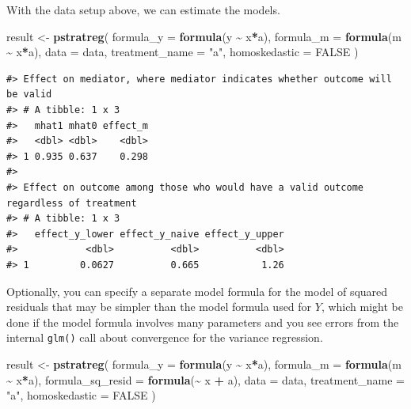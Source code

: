 \documentclass[
]{book}
\newenvironment{Shaded}{\begin{snugshade}}{\end{snugshade}}
\newcommand{\AttributeTok}[1]{\textcolor[rgb]{0.13,0.29,0.53}{#1}}
\newcommand{\ConstantTok}[1]{\textcolor[rgb]{0.56,0.35,0.01}{#1}}
\newcommand{\FunctionTok}[1]{\textcolor[rgb]{0.13,0.29,0.53}{\textbf{#1}}}
\newcommand{\NormalTok}[1]{#1}
\newcommand{\OtherTok}[1]{\textcolor[rgb]{0.56,0.35,0.01}{#1}}
\newcommand{\SpecialCharTok}[1]{\textcolor[rgb]{0.81,0.36,0.00}{\textbf{#1}}}
\newcommand{\StringTok}[1]{\textcolor[rgb]{0.31,0.60,0.02}{#1}}
\begin{document}
With the data setup above, we can estimate the models.

\begin{Shaded}
\begin{Highlighting}[]
\NormalTok{result }\OtherTok{\textless{}{-}} \FunctionTok{pstratreg}\NormalTok{(}
  \AttributeTok{formula\_y =} \FunctionTok{formula}\NormalTok{(y }\SpecialCharTok{\textasciitilde{}}\NormalTok{ x}\SpecialCharTok{*}\NormalTok{a),}
  \AttributeTok{formula\_m =} \FunctionTok{formula}\NormalTok{(m }\SpecialCharTok{\textasciitilde{}}\NormalTok{ x}\SpecialCharTok{*}\NormalTok{a),}
  \AttributeTok{data =}\NormalTok{ data,}
  \AttributeTok{treatment\_name =} \StringTok{"a"}\NormalTok{,}
  \AttributeTok{homoskedastic =} \ConstantTok{FALSE}
\NormalTok{)}
\end{Highlighting}
\end{Shaded}

\begin{verbatim}
#> Effect on mediator, where mediator indicates whether outcome will be valid
#> # A tibble: 1 x 3
#>   mhat1 mhat0 effect_m
#>   <dbl> <dbl>    <dbl>
#> 1 0.935 0.637    0.298
#> 
#> Effect on outcome among those who would have a valid outcome regardless of treatment
#> # A tibble: 1 x 3
#>   effect_y_lower effect_y_naive effect_y_upper
#>            <dbl>          <dbl>          <dbl>
#> 1         0.0627          0.665           1.26
\end{verbatim}

Optionally, you can specify a separate model formula for the model of squared residuals that may be simpler than the model formula used for \(Y\), which might be done if the model formula involves many parameters and you see errors from the internal \texttt{glm()} call about convergence for the variance regression.

\begin{Shaded}
\begin{Highlighting}[]
\NormalTok{result }\OtherTok{\textless{}{-}} \FunctionTok{pstratreg}\NormalTok{(}
  \AttributeTok{formula\_y =} \FunctionTok{formula}\NormalTok{(y }\SpecialCharTok{\textasciitilde{}}\NormalTok{ x}\SpecialCharTok{*}\NormalTok{a),}
  \AttributeTok{formula\_m =} \FunctionTok{formula}\NormalTok{(m }\SpecialCharTok{\textasciitilde{}}\NormalTok{ x}\SpecialCharTok{*}\NormalTok{a),}
  \AttributeTok{formula\_sq\_resid =} \FunctionTok{formula}\NormalTok{(}\SpecialCharTok{\textasciitilde{}}\NormalTok{ x }\SpecialCharTok{+}\NormalTok{ a),}
  \AttributeTok{data =}\NormalTok{ data,}
  \AttributeTok{treatment\_name =} \StringTok{"a"}\NormalTok{,}
  \AttributeTok{homoskedastic =} \ConstantTok{FALSE}
\NormalTok{)}
\end{Highlighting}
\end{Shaded}
\end{document}
